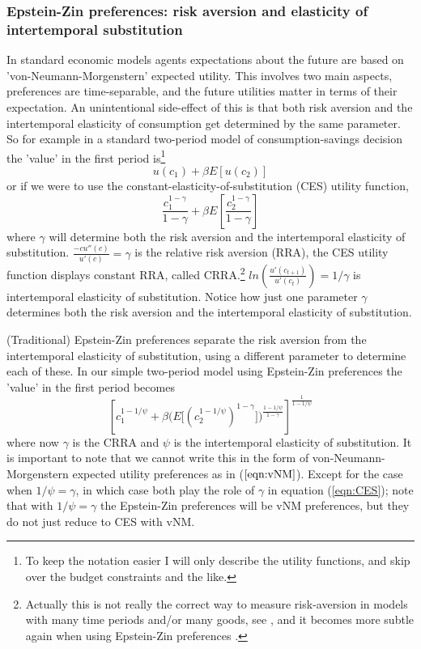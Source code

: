 \subsubsection{Epstein-Zin preferences: risk aversion and elasticity of intertemporal substitution} \label{app:EZbasicidea}
In standard economic models agents expectations about the future are based on 'von-Neumann-Morgenstern' expected utility. This involves two main aspects, preferences are time-separable, and the future utilities matter in terms of their expectation. An unintentional side-effect of this is that both risk aversion and the intertemporal elasticity of consumption get determined by the same parameter. So for example in a standard two-period model of consumption-savings decision the 'value' in the first period is\footnote{To keep the notation easier I will only describe the utility functions, and skip over the budget constraints and the like.}
\begin{equation}
 u(c_1)+\beta E[u(c_2)] \label{eqn:vNM}
\end{equation}
or if we were to use the constant-elasticity-of-substitution (CES) utility function,
\begin{equation}
 \frac{c_1^{1-\gamma}}{1-\gamma}+\beta E\left[\frac{c_2^{1-\gamma}}{1-\gamma}\right] \label{eqn:CES}
\end{equation}
where $\gamma$ will determine both the risk aversion and the intertemporal elasticity of substitution. $\frac{-cu''(c)}{u'(c)}=\gamma$ is the relative risk aversion (RRA), the CES utility function displays constant RRA, called CRRA.\footnote{Actually this is not really the correct way to measure risk-aversion in models with many time periods and/or many goods, see \cite*{Swanson2012}, and it becomes more subtle again when using Epstein-Zin preferences \citep*{Swanson2018}.} $ln\left(\frac{u'(c_{t+1})}{u'(c_t)}\right)=1/\gamma$ is intertemporal elasticity of substitution. Notice how just one parameter $\gamma$ determines both the risk aversion and the intertemporal elasticity of substitution.


(Traditional) Epstein-Zin preferences \citep*{EpsteinZin1989} separate the risk aversion from the intertemporal elasticity of substitution, using a different parameter to determine each of these. In our simple two-period model using Epstein-Zin preferences the 'value' in the first period becomes
\begin{equation*}
 \left[c_1^{1-1/\psi} + \beta \big(E\big[(c_2^{1-1/\psi})^{1-\gamma}\big])^{\frac{1-1/\psi}{1-\gamma}}\right] ^{\frac{1}{1-1/\psi}}
\end{equation*}
where now $\gamma$ is the CRRA and $\psi$ is the intertemporal elasticity of substitution. It is important to note that we cannot write this in the form of von-Neumann-Morgenstern expected utility preferences as in ($\ref{eqn:vNM}$). Except for the case when $1/\psi=\gamma$, in which case both play the role of $\gamma$ in equation (\ref{eqn:CES}); note that with $1/\psi=\gamma$ the Epstein-Zin preferences will be vNM preferences, but they do not just reduce to CES with vNM.

